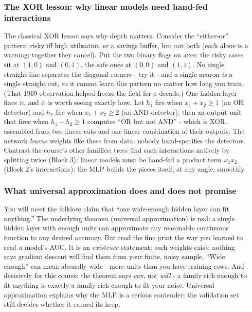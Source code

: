 \documentclass[11pt,a4paper]{article}
\begin{document}
\subsubsection{The XOR lesson: why linear models need hand-fed
interactions}
The classical XOR lesson says why depth matters. Consider the
``either-or'' pattern: risky iff high utilisation \emph{or} a savings
buffer, but not both (each alone is a warning; together they cancel). Put the two binary flags on axes: the risky cases
sit at $(1,0)$ and $(0,1)$, the safe ones at $(0,0)$ and $(1,1)$. No
single straight line separates the diagonal corners - try it - and a
single neuron \emph{is} a single straight cut, so it cannot learn this
pattern no matter how long you train. (That 1969 observation helped
freeze the field for a decade.) One hidden layer fixes it, and it is
worth seeing exactly how. Let $h_1$ fire when $x_1 + x_2 \ge 1$ (an OR
detector) and $h_2$ fire when $x_1 + x_2 \ge 2$ (an AND detector); then
an output unit that fires when $h_1 - h_2 \ge 1$ computes ``OR but not
AND'' - which is XOR, assembled from two linear cuts and one linear
combination of their outputs. The network \emph{learns} weights like
these from data; nobody hand-specifies the detectors. Contrast the
course's other families: trees find such interactions natively by
splitting twice (Block 3); linear models must be hand-fed a product
term $x_1 x_2$ (Block 2's interactions); the MLP builds the pieces
itself, at any angle, smoothly.

\subsubsection{What universal approximation does and does not promise}
You will meet the folklore claim that ``one wide-enough hidden layer can
fit anything.'' The underlying theorem (universal approximation) is
real: a single hidden layer with enough units can approximate any
reasonable continuous function to any desired accuracy. But read the
fine print the way you learned to read a model's AUC. It is an
\emph{existence} statement: such weights exist; nothing says gradient
descent will find them from your finite, noisy sample. ``Wide enough''
can mean absurdly wide - more units than you have training rows. And
decisively for this course: the theorem says \emph{can}, not
\emph{will} - a family rich enough to fit anything is exactly a family
rich enough to fit your noise. Universal approximation explains why the
MLP is a serious contender; the validation set still decides whether it
earned its keep.
\end{document}

